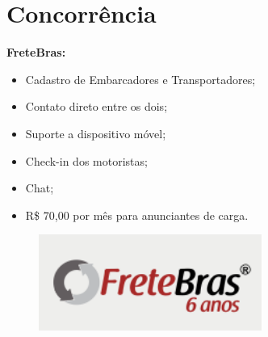	
	
	
	
	\section{Concorrência}
            
            
            
            
		\begin{minipage}{0.48\textwidth}
			\textbf{FreteBras:} 
			
            \begin{itemize}
              \item Cadastro de Embarcadores e Transportadores;
              \item Contato direto entre os dois;
              \item Suporte a dispositivo móvel;
              \item Check-in dos motoristas;
              \item Chat;
              \item R\$ 70,00 por mês para anunciantes de carga.
            \end{itemize}
				
		\end{minipage}
		\begin{minipage}{0.48\textwidth}
			
			\begin{figure}[H]
				\centering
				\includegraphics[width=0.65\textwidth]{img/fretebras.png}
			\end{figure}
			
		\end{minipage}
        \bigskip
            
